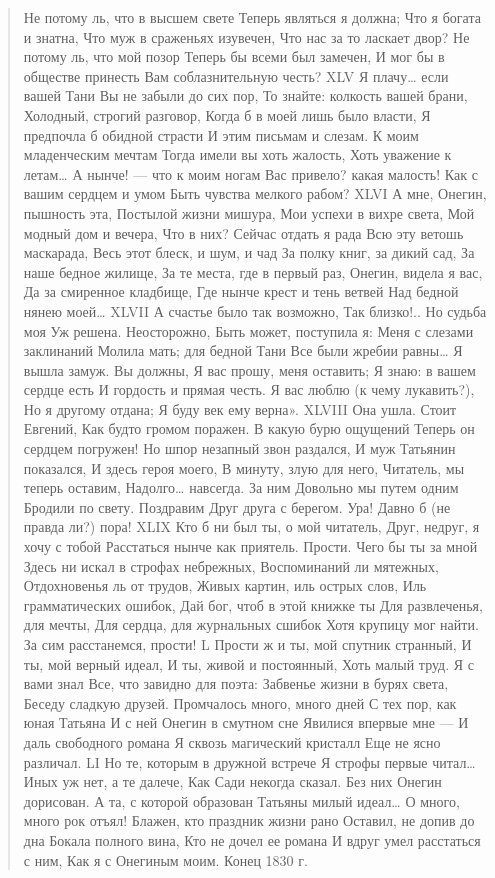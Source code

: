 \begin{verse}
Не потому ль, что в высшем свете
Теперь являться я должна;
Что я богата и знатна,
Что муж в сраженьях изувечен,
Что нас за то ласкает двор?
Не потому ль, что мой позор
Теперь бы всеми был замечен,
И мог бы в обществе принесть
Вам соблазнительную честь?
XLV
Я плачу… если вашей Тани
Вы не забыли до сих пор,
То знайте: колкость вашей брани,
Холодный, строгий разговор,
Когда б в моей лишь было власти,
Я предпочла б обидной страсти
И этим письмам и слезам.
К моим младенческим мечтам
Тогда имели вы хоть жалость,
Хоть уважение к летам…
А нынче! — что к моим ногам
Вас привело? какая малость!
Как с вашим сердцем и умом
Быть чувства мелкого рабом?
XLVI
А мне, Онегин, пышность эта,
Постылой жизни мишура,
Мои успехи в вихре света,
Мой модный дом и вечера,
Что в них? Сейчас отдать я рада
Всю эту ветошь маскарада,
Весь этот блеск, и шум, и чад
За полку книг, за дикий сад,
За наше бедное жилище,
За те места, где в первый раз,
Онегин, видела я вас,
Да за смиренное кладбище,
Где нынче крест и тень ветвей
Над бедной нянею моей…
XLVII
А счастье было так возможно,
Так близко!.. Но судьба моя
Уж решена. Неосторожно,
Быть может, поступила я:
Меня с слезами заклинаний
Молила мать; для бедной Тани
Все были жребии равны…
Я вышла замуж. Вы должны,
Я вас прошу, меня оставить;
Я знаю: в вашем сердце есть
И гордость и прямая честь.
Я вас люблю (к чему лукавить?),
Но я другому отдана;
Я буду век ему верна».
XLVIII
Она ушла. Стоит Евгений,
Как будто громом поражен.
В какую бурю ощущений
Теперь он сердцем погружен!
Но шпор незапный звон раздался,
И муж Татьянин показался,
И здесь героя моего,
В минуту, злую для него,
Читатель, мы теперь оставим,
Надолго… навсегда. За ним
Довольно мы путем одним
Бродили по свету. Поздравим
Друг друга с берегом. Ура!
Давно б (не правда ли?) пора!
XLIX
Кто б ни был ты, о мой читатель,
Друг, недруг, я хочу с тобой
Расстаться нынче как приятель.
Прости. Чего бы ты за мной
Здесь ни искал в строфах небрежных,
Воспоминаний ли мятежных,
Отдохновенья ль от трудов,
Живых картин, иль острых слов,
Иль грамматических ошибок,
Дай бог, чтоб в этой книжке ты
Для развлеченья, для мечты,
Для сердца, для журнальных сшибок
Хотя крупицу мог найти.
За сим расстанемся, прости!
L
Прости ж и ты, мой спутник странный,
И ты, мой верный идеал,
И ты, живой и постоянный,
Хоть малый труд. Я с вами знал
Все, что завидно для поэта:
Забвенье жизни в бурях света,
Беседу сладкую друзей.
Промчалось много, много дней
С тех пор, как юная Татьяна
И с ней Онегин в смутном сне
Явилися впервые мне —
И даль свободного романа
Я сквозь магический кристалл
Еще не ясно различал.
LI
Но те, которым в дружной встрече
Я строфы первые читал…
Иных уж нет, а те далече,
Как Сади некогда сказал.
Без них Онегин дорисован.
А та, с которой образован
Татьяны милый идеал…
О много, много рок отъял!
Блажен, кто праздник жизни рано
Оставил, не допив до дна
Бокала полного вина,
Кто не дочел ее романа
И вдруг умел расстаться с ним,
Как я с Онегиным моим.
Конец
1830 г.
\end{verse} 
